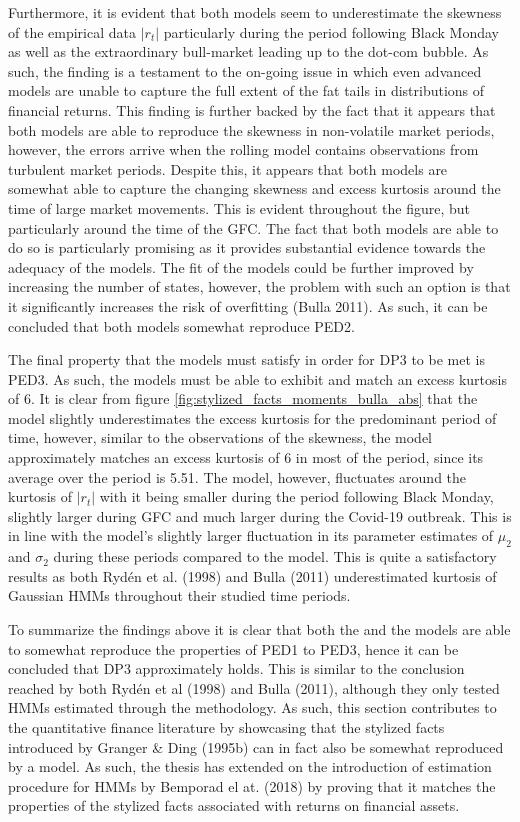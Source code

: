 Furthermore, it is evident that both models seem to underestimate the skewness of the empirical data $|r_t|$ particularly during the period following Black Monday as well as the extraordinary bull-market leading up to the dot-com bubble. As such, the finding is a testament to the on-going issue in which even advanced models are unable to capture the full extent of the fat tails in distributions of financial returns. This finding is further backed by the fact that it appears that both models are able to reproduce the skewness in non-volatile market periods, however, the errors arrive when the rolling model contains observations from turbulent market periods. Despite this, it appears that both models are somewhat able to capture the changing skewness and excess kurtosis around the time of large market movements. This is evident throughout the figure, but particularly around the time of the GFC. The fact that both models are able to do so is particularly promising as it provides substantial evidence towards the adequacy of the models. The fit of the models could be further improved by increasing the number of states, however, the problem with such an option is that it significantly increases the risk of overfitting (Bulla 2011). As such, it can be concluded that both models somewhat reproduce PED2.

The final property that the models must satisfy in order for DP3 to be met is PED3. As such, the models must be able to exhibit and match an excess kurtosis of 6. It is clear from figure \ref{fig:stylized_facts_moments_bulla_abs} that the \mle model slightly underestimates the excess kurtosis for the predominant period of time, however, similar to the observations of the skewness, the model approximately matches an excess kurtosis of 6 in most of the period, since its average over the period is 5.51. The \jump model, however, fluctuates around the kurtosis of $|r_t|$ with it being smaller during the period following Black Monday, slightly larger during GFC and much larger during the Covid-19 outbreak. This is in line with the \jump model's slightly larger fluctuation in its parameter estimates of $\mu_2$ and $\sigma_2$ during these periods compared to the \mle model. This is quite a satisfactory results as both Rydén et al. (1998) and Bulla (2011) underestimated kurtosis of Gaussian HMMs throughout their studied time periods.

To summarize the findings above it is clear that both the \mle and the \jump models are able to somewhat reproduce the properties of PED1 to PED3, hence it can be concluded that DP3 approximately holds. This is similar to the conclusion reached by both Rydén et al (1998) and Bulla (2011), although they only tested HMMs estimated through the \mle methodology. As such, this section contributes to the quantitative finance literature by showcasing that the stylized facts introduced by Granger \& Ding (1995b) can in fact also be somewhat reproduced by a \jump model. As such, the thesis has extended on the introduction of \jump estimation procedure for HMMs by Bemporad el at. (2018) by proving that it matches the properties of the stylized facts associated with returns on financial assets.

